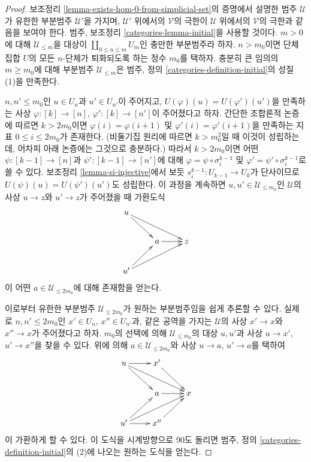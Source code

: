 \begin{proof}
보조정리 \ref{lemma-exists-hom-0-from-simplicial-set}의 증명에서 설명한
범주 $\mathcal{U}$가 유한한 부분범주 $\mathcal{U}'$을 가지며,
$\mathcal{U}'$ 위에서의 $\mathcal{V}$의 극한이 $\mathcal{U}$ 위에서의
$\mathcal{V}$의 극한과 같음을 보여야 한다.
범주, 보조정리 \ref{categories-lemma-initial}을 사용할 것이다.
$m > 0$에 대해 $\mathcal{U}_{\leq m}$을 대상이
$\coprod_{0 \leq n \leq m} U_m$인 충만한 부분범주라 하자.
$n > m_0$이면 단체 집합 $U$의 모든 $n$-단체가 퇴화되도록 하는
정수 $m_0$를 택하자. 충분히 큰 임의의 $m \geq m_0$에 대해
부분범주 $\mathcal{U}_{\leq m}$은 범주, 정의
\ref{categories-definition-initial}의 성질 (1)을 만족한다.

\medskip\noindent
$n, n' \leq m_0$인 $u \in U_n$과 $u' \in U_{n'}$이 주어지고,
$U(\varphi)(u) = U(\varphi')(u')$을 만족하는 사상
$\varphi : [k] \to [n]$, $\varphi' : [k] \to [n']$이 주어졌다고 하자.
간단한 조합론적 논증에 따르면 $k > 2m_0$이면
$\varphi(i) =\varphi(i + 1)$ 및 $\varphi'(i) = \varphi'(i + 1)$을
만족하는 지표 $0 \leq i \leq 2m_0$가 존재한다.
(비둘기집 원리에 따르면 $k > m_0^2$일 때 이것이 성립하는데,
어차피 아래 논증에는 그것으로 충분하다.) 따라서 $k > 2m_0$이면
어떤 $\psi : [k - 1] \to [n]$과
$\psi' : [k - 1] \to [n']$에 대해
$\varphi = \psi \circ \sigma^{k - 1}_i$ 및
$\varphi' = \psi' \circ \sigma^{k - 1}_i$로 쓸 수 있다.
보조정리 \ref{lemma-si-injective}에서 보듯
$s^{k - 1}_i : U_{k - 1} \to U_k$가 단사이므로
$U(\psi)(u) = U(\psi')(u')$도 성립한다.
이 과정을 계속하면 $u, u' \in \mathcal{U}_{\leq m_0}$인
$\mathcal{U}$의 사상 $u \to z$와 $u' \to z$가 주어졌을 때
가환도식
$$
\xymatrix{
u \ar[rd] \ar[rrd] & & \\
& a \ar[r] & z \\
u' \ar[ru] \ar[rru]
}
$$
이 어떤 $a \in \mathcal{U}_{\leq 2m_0}$에 대해 존재함을 얻는다.

\medskip\noindent
이로부터 유한한 부분범주 $\mathcal{U}_{\leq 2m_0}$가 원하는
부분범주임을 쉽게 추론할 수 있다. 실제로
$n, n' \leq 2m_0$인 $x' \in U_n$, $x'' \in U_{n'}$과,
같은 공역을 가지는 $\mathcal{U}$의 사상 $x' \to x$와
$x'' \to x$가 주어졌다고 하자. $m_0$의 선택에 의해
$\mathcal{U}_{\leq m_0}$의 대상 $u, u'$과 사상
$u \to x'$, $u' \to x''$을 찾을 수 있다.
위에 의해 $a \in \mathcal{U}_{\leq 2m_0}$와 사상
$u \to a$, $u' \to a$를 택하여
$$
\xymatrix{
u \ar[rd] \ar[rrd] \ar[r] & x' \ar[rd] & \\
& a \ar[r] & x \\
u' \ar[ru] \ar[rru] \ar[r] & x'' \ar[ru] &
}
$$
이 가환하게 할 수 있다. 이 도식을 시계방향으로 90도 돌리면
범주, 정의 \ref{categories-definition-initial}의 (2)에 나오는
원하는 도식을 얻는다.
\end{proof}

